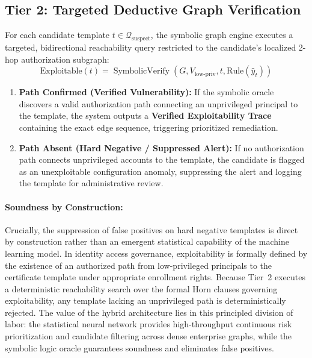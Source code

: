 \subsection{Tier 2: Targeted Deductive Graph Verification}
For each candidate template $t \in \mathcal{Q}_{\text{suspect}}$, the symbolic graph engine executes a targeted, bidirectional reachability query restricted to the candidate's localized 2-hop authorization subgraph:
\begin{equation}
\text{Exploitable}(t) = \operatorname{SymbolicVerify}(G, V_{\text{low-priv}}, t, \text{Rule}(\hat{y}_t))
\end{equation}
\begin{enumerate}
    \item \textbf{Path Confirmed (Verified Vulnerability):} If the symbolic oracle discovers a valid authorization path connecting an unprivileged principal to the template, the system outputs a \textbf{Verified Exploitability Trace} containing the exact edge sequence, triggering prioritized remediation.
    \item \textbf{Path Absent (Hard Negative / Suppressed Alert):} If no authorization path connects unprivileged accounts to the template, the candidate is flagged as an unexploitable configuration anomaly, suppressing the alert and logging the template for administrative review.
\end{enumerate}

\paragraph{Soundness by Construction:}
Crucially, the suppression of false positives on hard negative templates is direct by construction rather than an emergent statistical capability of the machine learning model. In identity access governance, exploitability is formally defined by the existence of an authorized path from low-privileged principals to the certificate template under appropriate enrollment rights. Because Tier~2 executes a deterministic reachability search over the formal Horn clauses governing exploitability, any template lacking an unprivileged path is deterministically rejected. The value of the hybrid architecture lies in this principled division of labor: the statistical neural network provides high-throughput continuous risk prioritization and candidate filtering across dense enterprise graphs, while the symbolic logic oracle guarantees soundness and eliminates false positives.


